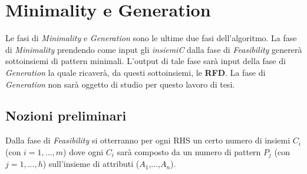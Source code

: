 \section{Minimality e Generation}
Le fasi di \emph{Minimality} e \emph{Generation} sono le ultime due fasi dell'algoritmo. La fase di \emph{Minimality} prendendo come input gli \emph{insiemiC} dalla fase di \emph{Feasibility} genererà sottoinsiemi di pattern minimali. L'output di tale fase sarà input della fase di \emph{Generation} la quale ricaverà, da questi sottoinsiemi, le \textbf{RFD}. La fase di \emph{Generation} non sarà oggetto di studio per questo lavoro di tesi.
\subsection{Nozioni preliminari}
Dalla fase di \emph{Feasibility} si otterranno per ogni RHS un certo numero di insiemi $C_i$ (con $i=1,...,m$) dove ogni $C_i$ sarà composto da un numero di pattern $P_j$ (con $j=1,...,h$) sull'insieme di attributi ($A_1$,...,$A_n$).
